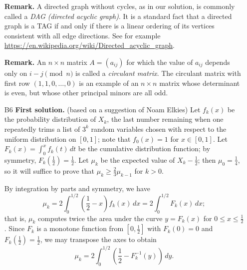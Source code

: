 \documentclass[amssymb,twocolumn,pra,10pt,aps]{revtex4-1}
\begin{document}
\begin{itemize}
\noindent
\textbf{Remark.}
A directed graph without cycles, as in our solution, is commonly called a \emph{DAG (directed acyclic graph)}. It is a standard fact that a directed graph is a TAG if and only if there is a linear ordering of its vertices consistent with all edge directions.
See for example \url{https://en.wikipedia.org/wiki/Directed_acyclic_graph}.

\noindent
\textbf{Remark.}
An $n \times n$ matrix $A = (a_{ij})$ for which the value of $a_{ij}$ depends only on $i-j \pmod{n}$ is called a \emph{circulant matrix}.
The circulant matrix with first row $(1,1,0,\dots,0)$ is an example of an $n \times n$ matrix whose determinant is even, but whose other principal minors are all odd.

\item[B6]
\noindent
\textbf{First solution.}
(based on a suggestion of Noam Elkies)
Let $f_k(x)$ be the probability distribution of $X_k$, the last number remaining when one repeatedly trims a list of $3^k$ random variables chosen with respect to the uniform distribution on $[0,1]$; note that $f_0(x) = 1$ for $x \in [0,1]$.
Let $F_k(x)=\int_0^x f_k(t)\,dt$ be the cumulative distribution function; by symmetry,
$F_k(\frac{1}{2}) = \frac{1}{2}$.
Let $\mu_k$ be the expected value of $X_k - \frac{1}{2}$; then $\mu_0 = \frac{1}{4}$, so it will suffice to prove that $\mu_{k} \geq \frac{2}{3} \mu_{k-1}$ for $k > 0$.

By integration by parts and symmetry, we have
\[
\mu_k = 2 \int_0^{1/2} \left( \frac{1}{2} - x \right) f_k(x)\,dx  = 2 \int_0^{1/2} F_k(x)\,dx;
\]
that is, $\mu_k$ computes twice the area under the curve $y = F_k(x)$ for $0 \leq x \leq\frac{1}{2}$. Since $F_k$ is a monotone function from $[0, \frac{1}{2}]$ 
with $F_k(0) = 0$ and $F_k(\frac{1}{2}) = \frac{1}{2}$, we may transpose the axes to obtain
\begin{equation} \label{eq:2021B6 eq4}
\mu_k = 2 \int_0^{1/2} \left( \frac{1}{2} - F_k^{-1}(y) \right)\,dy.
\end{equation}


\end{itemize}
\end{document}
